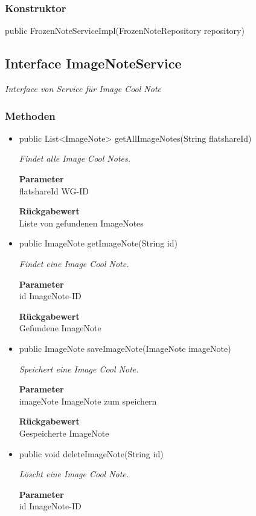 \documentclass[a4paper]{scrreprt}
\begin{document}
        \subsubsection{Konstruktor}
        public FrozenNoteServiceImpl(FrozenNoteRepository repository)
        \subsection{Interface ImageNoteService}
        \textit{Interface von Service für Image Cool Note}
        \subsubsection{Methoden}
        \begin{itemize}
        	\item{public List<ImageNote> getAllImageNotes(String flatshareId)}
        	
        	\textit{Findet alle Image Cool Notes.}
        	
        	\textbf{Parameter} \\
        	flatshareId WG-ID
        	
        	\textbf{Rückgabewert} \\
        	Liste von gefundenen ImageNotes        \item{public ImageNote getImageNote(String id)}
        	
        	\textit{Findet eine Image Cool Note.}
        	
        	\textbf{Parameter} \\
        	id ImageNote-ID
        	
        	\textbf{Rückgabewert} \\
        	Gefundene ImageNote        \item{public ImageNote saveImageNote(ImageNote imageNote)}
        	
        	\textit{Speichert eine Image Cool Note.}
        	
        	\textbf{Parameter} \\
        	imageNote ImageNote zum speichern
        	
        	\textbf{Rückgabewert} \\
        	Gespeicherte ImageNote        \item{public void deleteImageNote(String id)}
        	
        	\textit{Löscht eine Image Cool Note.}
        	
        	\textbf{Parameter} \\
        	id ImageNote-ID
        	
        	
        \end{itemize}
\end{document}
